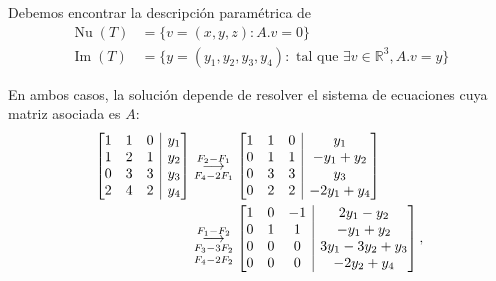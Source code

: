 \documentclass{beamer} %
\newcommand{\img}{\operatorname{Im}}
\newcommand{\nuc}{\operatorname{Nu}}
\newcommand{\R}{\mathbb R}
\begin{document}
        

        \begin{frame}
            Debemos encontrar la descripción paramétrica de
            \begin{align*}
                \nuc(T) &= \{v=(x,y,z):   A.{v}=0\}\\
                \img(T) &= \{y= (y_1,y_2,y_3,y_4): \text{ tal que } \exists v \in \R^3, A.{v} = {y}  \}
                \end{align*}
           
          
            En  ambos casos, la solución depende de resolver el sistema de ecuaciones cuya matriz asociada es $A$:
            \begin{align*}
            \left[\begin{array}{@{}*{3}{c}|c@{}}1&1&0&y_1\\1&2&1&y_2\\0&3&3&y_3\\2&4&2&y_4 \end{array}\right]
            &\underset{F_4-2F_1}{\stackrel{F_2 -F_1}{\longrightarrow}} 
            \left[\begin{array}{@{}*{3}{c}|c@{}}1&1&0&y_1\\0&1&1&-y_1+y_2\\0&3&3&y_3\\0&2&2&-2y_1 +y_4 \end{array}\right]\\
            &\underset{F_4-2F_2}{\underset{F_3-3F_2}{\stackrel{F_1 -F_2}{\longrightarrow}} } 
            \left[\begin{array}{@{}*{3}{c}|c@{}}1&0&-1&2y_1-y_2\\0&1&1&-y_1+y_2\\0&0&0&3y_1-3y_2+y_3\\0&0&0&-2y_2 +y_4 \end{array}\right],
            \end{align*}
        \end{frame}


        
\end{document}
